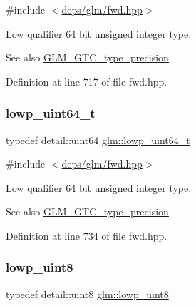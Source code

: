 {\ttfamily \#include $<$\hyperlink{fwd_8hpp}{deps/glm/fwd.\+hpp}$>$}

Low qualifier 64 bit unsigned integer type. \begin{DoxySeeAlso}{See also}
\hyperlink{group__gtc__type__precision}{G\+L\+M\+\_\+\+G\+T\+C\+\_\+type\+\_\+precision} 
\end{DoxySeeAlso}


Definition at line 717 of file fwd.\+hpp.

\mbox{\label{group__gtc__type__precision_gabf3069d4f188557a87b1d7f35eb0a270}} 
\subsubsection{\texorpdfstring{lowp\+\_\+uint64\+\_\+t}{lowp\_uint64\_t}}
{\footnotesize\ttfamily typedef detail\+::uint64 \hyperlink{group__gtc__type__precision_gabf3069d4f188557a87b1d7f35eb0a270}{glm\+::lowp\+\_\+uint64\+\_\+t}}



{\ttfamily \#include $<$\hyperlink{fwd_8hpp}{deps/glm/fwd.\+hpp}$>$}

Low qualifier 64 bit unsigned integer type. \begin{DoxySeeAlso}{See also}
\hyperlink{group__gtc__type__precision}{G\+L\+M\+\_\+\+G\+T\+C\+\_\+type\+\_\+precision} 
\end{DoxySeeAlso}


Definition at line 734 of file fwd.\+hpp.

\mbox{\label{group__gtc__type__precision_ga4d9dc08b7b248a386dfe9afd00fc6b1e}} 
\subsubsection{\texorpdfstring{lowp\+\_\+uint8}{lowp\_uint8}}
{\footnotesize\ttfamily typedef detail\+::uint8 \hyperlink{group__gtc__type__precision_ga4d9dc08b7b248a386dfe9afd00fc6b1e}{glm\+::lowp\+\_\+uint8}}



